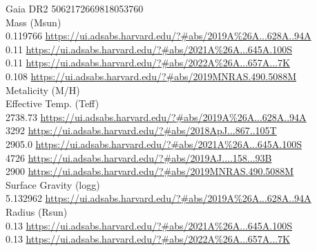 Gaia DR2 5062172669818053760\\
Mass (Msun)\\
0.119766 \url{https://ui.adsabs.harvard.edu/?#abs/2019A%26A...628A..94A}\\
0.11 \url{https://ui.adsabs.harvard.edu/?#abs/2021A%26A...645A.100S}\\
0.11 \url{https://ui.adsabs.harvard.edu/?#abs/2022A%26A...657A...7K}\\
0.108 \url{https://ui.adsabs.harvard.edu/?#abs/2019MNRAS.490.5088M}\\

Metalicity (M/H)\\

Effective Temp. (Teff)\\
2738.73 \url{https://ui.adsabs.harvard.edu/?#abs/2019A%26A...628A..94A}\\
3292 \url{https://ui.adsabs.harvard.edu/?#abs/2018ApJ...867..105T}\\
2905.0 \url{https://ui.adsabs.harvard.edu/?#abs/2021A%26A...645A.100S}\\
4726 \url{https://ui.adsabs.harvard.edu/?#abs/2019AJ....158...93B}\\
2900 \url{https://ui.adsabs.harvard.edu/?#abs/2019MNRAS.490.5088M}\\
Surface Gravity (logg)\\
5.132962 \url{https://ui.adsabs.harvard.edu/?#abs/2019A%26A...628A..94A}\\

Radius (Rsun)\\
0.13 \url{https://ui.adsabs.harvard.edu/?#abs/2021A%26A...645A.100S}\\
0.13 \url{https://ui.adsabs.harvard.edu/?#abs/2022A%26A...657A...7K}\\
